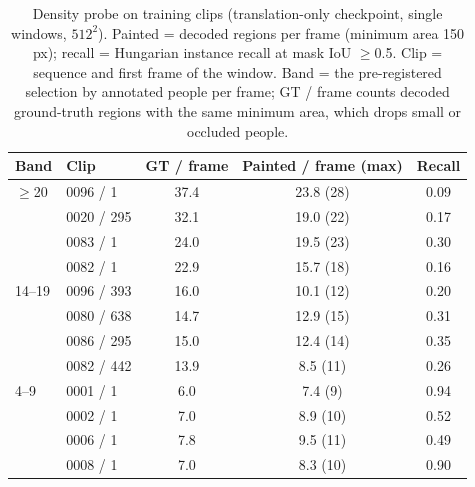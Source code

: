 \documentclass{article} %
\newcommand{\rev}[1]{#1}
\begin{document}
\begin{table}[h]
\caption{\rev{Density probe on training clips (translation-only checkpoint, single windows,
$512^2$). Painted = decoded regions per frame (minimum area 150 px); recall = Hungarian
instance recall at mask IoU $\geq$0.5. Clip = sequence and first frame of the window. Band =
the pre-registered selection by annotated people per frame; GT / frame counts decoded
ground-truth regions with the same minimum area, which drops small or occluded people.}}
\label{tab:densetrain}
\begin{center}
\scriptsize
\begin{tabular}{llccc}
\toprule
\rev{Band} & \rev{Clip} & \rev{GT / frame} & \rev{Painted / frame (max)} & \rev{Recall} \\
\midrule
\rev{$\geq$20} & \rev{0096 / 1} & \rev{37.4} & \rev{23.8 (28)} & \rev{0.09} \\
 & \rev{0020 / 295} & \rev{32.1} & \rev{19.0 (22)} & \rev{0.17} \\
 & \rev{0083 / 1} & \rev{24.0} & \rev{19.5 (23)} & \rev{0.30} \\
 & \rev{0082 / 1} & \rev{22.9} & \rev{15.7 (18)} & \rev{0.16} \\
\rev{14--19} & \rev{0096 / 393} & \rev{16.0} & \rev{10.1 (12)} & \rev{0.20} \\
 & \rev{0080 / 638} & \rev{14.7} & \rev{12.9 (15)} & \rev{0.31} \\
 & \rev{0086 / 295} & \rev{15.0} & \rev{12.4 (14)} & \rev{0.35} \\
 & \rev{0082 / 442} & \rev{13.9} & \rev{8.5 (11)} & \rev{0.26} \\
\rev{4--9} & \rev{0001 / 1} & \rev{6.0} & \rev{7.4 (9)} & \rev{0.94} \\
 & \rev{0002 / 1} & \rev{7.0} & \rev{8.9 (10)} & \rev{0.52} \\
 & \rev{0006 / 1} & \rev{7.8} & \rev{9.5 (11)} & \rev{0.49} \\
 & \rev{0008 / 1} & \rev{7.0} & \rev{8.3 (10)} & \rev{0.90} \\
\bottomrule
\end{tabular}
\end{center}
\end{table}
\end{document}
